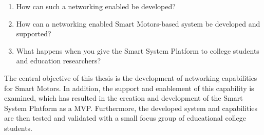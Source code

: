 \begin{enumerate}
    \item How can such a networking enabled be developed?
    \item How can a networking enabled Smart Motors-based system be developed and supported?
    \item What happens when you give the Smart System Platform to college students and education researchers?
\end{enumerate}

The central objective of this thesis is the development of networking capabilities for Smart Motors. In addition, the support and enablement of this capability is examined, which has resulted in the creation and development of the Smart System Platform as a MVP. Furthermore, the developed system and capabilities are then tested and validated with a small focus group of educational college students. 



